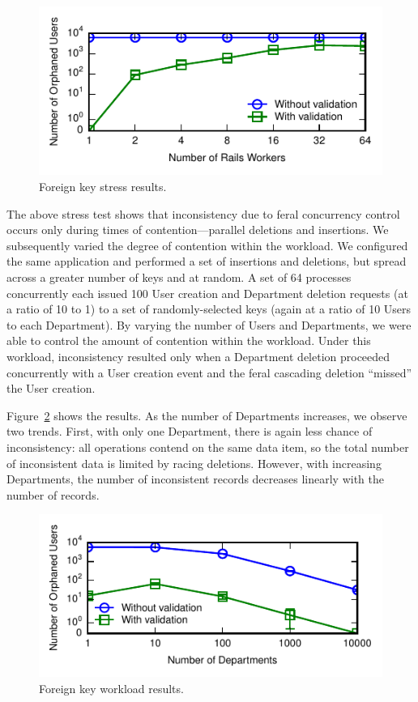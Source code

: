 \begin{figure}
\includegraphics[width=\columnwidth]{figs/fk-stress-violations.pdf}
\caption{Foreign key stress results.}
\label{fig:fk-stress}
\end{figure}

The above stress test shows that inconsistency due to feral
concurrency control occurs only during times of contention---parallel
deletions and insertions. We subsequently varied the degree of
contention within the workload. We configured the same application and
performed a set of insertions and deletions, but spread across a
greater number of keys and at random. A set of 64 processes
concurrently each issued 100 User creation and Department deletion requests (at
a ratio of 10 to 1) to a set of randomly-selected keys (again at a ratio of 10
Users to each Department). By varying the number of Users and
Departments, we were able to control the amount of contention within
the workload. Under this workload, inconsistency resulted only when a
Department deletion proceeded concurrently with a User creation event
and the feral cascading deletion ``missed'' the User creation.

Figure~\ref{fig:fk-workload} shows the results. As the number of
Departments increases, we observe two trends. First, with only one
Department, there is again less chance of inconsistency: all
operations contend on the same data item, so the total number of
inconsistent data is limited by racing deletions. However, with
increasing Departments, the number of inconsistent records decreases
linearly with the number of records.

\begin{figure}
\includegraphics[width=\columnwidth]{figs/fk-workload-violations.pdf}
\caption{Foreign key workload results.}
\label{fig:fk-workload}
\end{figure}

